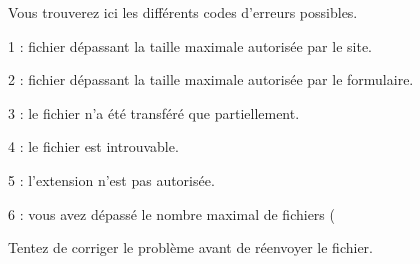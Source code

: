 ﻿Vous trouverez ici les différents codes d’erreurs possibles.
\item 1 : fichier dépassant la taille maximale autorisée par le site.
\item 2 : fichier dépassant la taille maximale autorisée par le formulaire.
\item 3 : le fichier n’a été transféré que partiellement.
\item 4 : le fichier est introuvable.
\item 5 : l’extension n’est pas autorisée.
\item 6 : vous avez dépassé le nombre maximal de fichiers (%

Tentez de corriger le problème avant de réenvoyer le fichier.